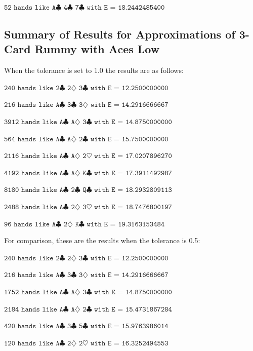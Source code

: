 \documentclass[letter,12pt]{article}
\begin{document}
{$\texttt{52 hands like A$\clubsuit$ 4$\clubsuit$ 7$\clubsuit$ with E = 18.2442485400}$

\subsection{Summary of Results for Approximations of 3-Card Rummy with Aces Low}

When the tolerance is set to 1.0 the results are as follows:

$\texttt{240 hands like 2$\clubsuit$ 2$\diamondsuit$ 3$\clubsuit$ with E = 12.2500000000}$

$\texttt{216 hands like A$\clubsuit$ 3$\clubsuit$ 3$\diamondsuit$ with E = 14.2916666667}$

$\texttt{3912 hands like A$\clubsuit$ A$\diamondsuit$ 3$\clubsuit$ with E = 14.8750000000}$

$\texttt{564 hands like A$\clubsuit$ A$\diamondsuit$ 2$\clubsuit$ with E = 15.7500000000}$

$\texttt{2116 hands like A$\clubsuit$ A$\diamondsuit$ 2$\heartsuit$ with E = 17.0207896270}$

$\texttt{4192 hands like A$\clubsuit$ A$\diamondsuit$ K$\clubsuit$ with E = 17.3911492987}$

$\texttt{8180 hands like A$\clubsuit$ 2$\clubsuit$ Q$\clubsuit$ with E = 18.2932809113}$

$\texttt{2488 hands like A$\clubsuit$ 2$\diamondsuit$ 3$\heartsuit$ with E = 18.7476800197}$

$\texttt{96 hands like A$\clubsuit$ 2$\diamondsuit$ K$\clubsuit$ with E = 19.3163153484}$

\smallskip
For comparison, these are the results when the tolerance is 0.5:

$\texttt{240 hands like 2$\clubsuit$ 2$\diamondsuit$ 3$\clubsuit$ with E = 12.2500000000}$

$\texttt{216 hands like A$\clubsuit$ 3$\clubsuit$ 3$\diamondsuit$ with E = 14.2916666667}$

$\texttt{1752 hands like A$\clubsuit$ A$\diamondsuit$ 3$\clubsuit$ with E = 14.8750000000}$

$\texttt{2184 hands like A$\clubsuit$ A$\diamondsuit$ 2$\clubsuit$ with E = 15.4731867284}$

$\texttt{420 hands like A$\clubsuit$ 3$\clubsuit$ 5$\clubsuit$ with E = 15.9763986014}$

$\texttt{120 hands like A$\clubsuit$ 2$\diamondsuit$ 2$\heartsuit$ with E = 16.3252494553}$

}
\end{document}
